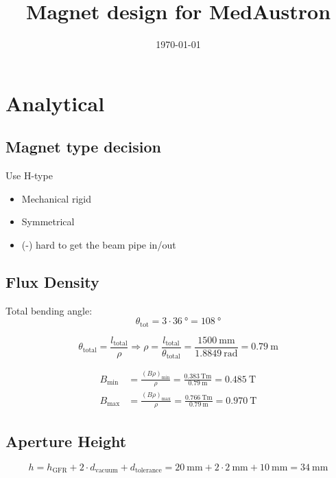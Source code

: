 \documentclass[10pt,a4paper,noendnumber=true]{scrartcl}
\title{Magnet design for MedAustron}
\subtitle{}
\author{}
\date{\today}
\begin{document}
\maketitle

\section{Analytical}

\subsection{Magnet type decision}
Use H-type
\begin{itemize}
\item Mechanical rigid
\item Symmetrical
\item (-) hard to get the beam pipe in/out
\end{itemize}


\subsection{Flux Density}
Total bending angle:
\begin{equation}
    \theta_\text{tot} = 3 \cdot \SI{36}{\degree} = \SI{108}{\degree}
\end{equation}

\begin{equation}
    \theta_\text{total} = \frac{l_\text{total}}{\rho} \Rightarrow \rho = \frac{l_\text{total}}{\theta_\text{total}} = \frac{\SI{1500}{\mm}}{\SI{1.8849}{\radian}} = \SI{0.79}{\meter}
\end{equation}

\begin{align}
    B_\text{min} &= \frac{(B \rho)_\text{min}}{\rho} = \frac{\SI{0.383}{\tesla\meter}}{\SI{0.79}{\meter}} = \SI{0.485}{\tesla}\\
    B_\text{max} &= \frac{(B \rho)_\text{max}}{\rho} = \frac{\SI{0.766}{\tesla\meter}}{\SI{0.79}{\meter}} = \SI{0.970}{\tesla}
\end{align}

\subsection{Aperture Height}
\begin{equation}
    h = h_\text{GFR} + 2\cdot d_\text{vacuum} + d_\text{tolerance} =
    \SI{20}{\mm} + 2\cdot \SI{2}{\mm} + \SI{10}{\mm} = \SI{34}{\mm}
\end{equation}
\end{document}
